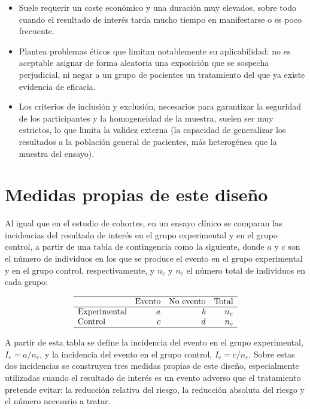 \documentclass[
  spanish,
  a4paper,
]{scrreport}
\providecommand{\tightlist}{%
  \setlength{\itemsep}{0pt}\setlength{\parskip}{0pt}}
\theoremstyle{definition}
\theoremstyle{definition}
\theoremstyle{remark}
\begin{document}
\begin{itemize}
\tightlist
\item
  Suele requerir un coste económico y una duración muy elevados, sobre
  todo cuando el resultado de interés tarda mucho tiempo en manifestarse
  o es poco frecuente.
\item
  Plantea problemas éticos que limitan notablemente su aplicabilidad: no
  es aceptable asignar de forma aleatoria una exposición que se sospecha
  perjudicial, ni negar a un grupo de pacientes un tratamiento del que
  ya existe evidencia de eficacia.
\item
  Los criterios de inclusión y exclusión, necesarios para garantizar la
  seguridad de los participantes y la homogeneidad de la muestra, suelen
  ser muy estrictos, lo que limita la validez externa (la capacidad de
  generalizar los resultados a la población general de pacientes, más
  heterogénea que la muestra del ensayo).
\end{itemize}

\section{Medidas propias de este
diseño}\label{medidas-propias-de-este-diseuxf1o-5}

Al igual que en el estudio de cohortes, en un ensayo clínico se comparan
las incidencias del resultado de interés en el grupo experimental y en
el grupo control, a partir de una tabla de contingencia como la
siguiente, donde \(a\) y \(c\) son el número de individuos en los que se
produce el evento en el grupo experimental y en el grupo control,
respectivamente, y \(n_e\) y \(n_c\) el número total de individuos en
cada grupo:

\[
\begin{array}{lrrr}
\hline
 & \mbox{Evento} & \mbox{No evento} & \mbox{Total}\\
\hline
\mbox{Experimental} & a & b & n_e\\
\mbox{Control} & c & d & n_c\\
\hline
\end{array}
\]

A partir de esta tabla se define la incidencia del evento en el grupo
experimental, \(I_e = a/n_e\), y la incidencia del evento en el grupo
control, \(I_c = c/n_c\). Sobre estas dos incidencias se construyen tres
medidas propias de este diseño, especialmente utilizadas cuando el
resultado de interés es un evento adverso que el tratamiento pretende
evitar: la reducción relativa del riesgo, la reducción absoluta del
riesgo y el número necesario a tratar.
\end{document}
